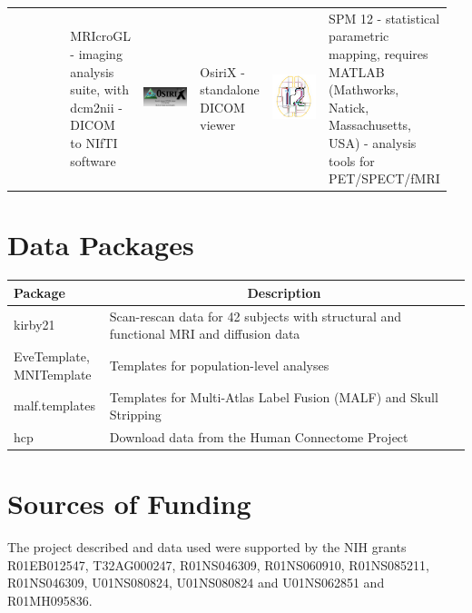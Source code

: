 \documentclass[final]{beamer}\usepackage[]{graphicx}\usepackage[]{color}
\begin{document}
\begin{frame}[fragile]
\begin{table}[!htb]
\begin{minipage}{0.40\linewidth}
\begin{tabular}{>{\centering}m{0.16\linewidth}>{\centering}m{0.16\linewidth}|>{\centering}m{0.16\linewidth}>{\centering}m{0.16\linewidth}|>{\centering}m{0.16\linewidth}>{\centering\arraybackslash}m{0.16\linewidth}}
& MRIcroGL - imaging analysis suite, with dcm2nii - DICOM to NIfTI software
& \includegraphics[clip, width=5cm, keepaspectratio]{figures/OsiriX.png}
& OsiriX - standalone DICOM viewer  
& \includegraphics[clip, width=5cm, keepaspectratio]{figures/spm12.png} & SPM 12 - statistical parametric mapping, requires MATLAB (Mathworks, Natick, Massachusetts, USA) - analysis tools for PET/SPECT/fMRI
\end{tabular}

\section{Data Packages}
\begin{table}[h]
\centering
\begin{tabular}{>{\centering }m{0.21\linewidth}m{0.79\linewidth}}
Package & \multicolumn{1}{c}{Description} \\ \hline
kirby21 & Scan-rescan data for 42 subjects with structural and functional MRI and diffusion data \citep{kirby} \\
EveTemplate, MNITemplate & Templates for population-level analyses \citep{eve, fonov2011unbiased, fonov2009unbiased}   \\
malf.templates & Templates \citep{bennett2012miccai} for Multi-Atlas Label Fusion (MALF) and Skull Stripping \\
hcp &  Download data from the Human Connectome Project	\citep{hcp}
\end{tabular}
\end{table}


\section{Sources of Funding}
{\scriptsize
The project described and data used were supported by the NIH grants R01EB012547, T32AG000247, R01NS046309, R01NS060910, R01NS085211, R01NS046309, U01NS080824, U01NS080824 and U01NS062851 and R01MH095836.
}




\end{minipage}
\end{table}
\end{frame}
\end{document}
